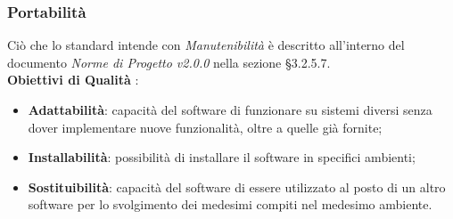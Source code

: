 \subsubsection{Portabilità}

Ciò che lo standard intende con \textit{Manutenibilità} è descritto all'interno del documento \textit{Norme di Progetto v2.0.0} nella sezione §3.2.5.7. \\

\textbf{Obiettivi di Qualità} :

\begin{itemize}
	\item \textbf{Adattabilità}: capacità del software di funzionare su sistemi diversi senza dover implementare nuove funzionalità, oltre a quelle già fornite;
	\item \textbf{Installabilità}: possibilità di installare il software in specifici ambienti;
	\item \textbf{Sostituibilità}: capacità del software di essere utilizzato al posto di un altro software per lo svolgimento dei medesimi compiti nel medesimo ambiente.
\end{itemize}

